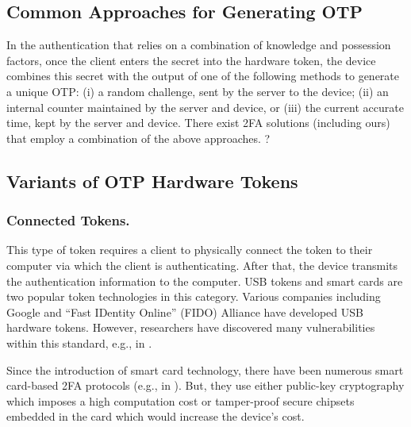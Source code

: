 \vspace{-5mm}
\subsection{Common Approaches for Generating OTP}
\vspace{-2mm}

In the authentication that relies on a combination of knowledge and possession factors, once the client enters the secret into the hardware token, the device combines this secret with the output of one of the following methods to generate a unique OTP:  (i) a random challenge, sent by the server to the device;  (ii) an internal counter maintained by the server and device, or (iii) the current accurate time, kept by the server and device. There exist 2FA solutions (including ours) that employ a combination of the above approaches. ?

\vspace{-4mm}
\subsection{Variants of OTP Hardware Tokens}

\vspace{-2mm}
\subsubsection{Connected Tokens.}
This type of token requires a client to physically connect the token to their computer via which the client is authenticating. After that, the device transmits the authentication information to the computer. USB tokens and smart cards are two popular token technologies in this category.  Various companies including Google and  ``Fast IDentity Online'' (FIDO) Alliance have developed USB hardware tokens. However, researchers have discovered many vulnerabilities within this standard, e.g., in \cite{PanosMNPX17,ChangMSS17,LoutfiJ15,ndss/FengLP021}.  

Since the introduction of smart card technology, there have been numerous smart card-based 2FA protocols (e.g., in \cite{gupta2021machine,WangW18,radhakrishnan2022dependable,kim2009more}). But, they use either public-key cryptography which imposes a high computation cost or tamper-proof secure chipsets embedded in the card which would increase the device's cost. 






